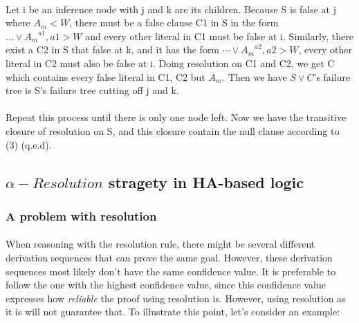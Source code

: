 \documentclass[part1.tex]{subfiles}
\begin{document}
\paragraph{}
Let i be an inference node with j and k are its children. Because S is false at j where \(A_m < W\),
there must be a false clause C1 in S in the form \(...\vee {A_{m}}^{a1}, a1 > W\) and every other 
literal in C1 must be false at i. Similarly, there exist a C2 in S that false at k, and it has the form 
\(\cdots\vee {A_{m}}^{a2}, a2 > W\), every other literal in C2 must also be false at i.
Doing resolution on C1 and C2, we get C which contains every false literal in C1, C2 but \(A_{m}\).
Then we have \(S \vee C\)'s failure tree is S's failure tree cutting off j and k.
\paragraph{} Repeat this process until there is only one node left. Now we have the transitive closure of resolution
on S, and this closure contain the null clause according to (3) (q.e.d).

\subsection{$\alpha-Resolution$ stragety in HA-based logic}
\subsubsection{A problem with resolution} 
\paragraph{} When reasoning with the resolution rule, there might
be several different derivation sequences that can prove the same
goal. However, these derivation sequences most likely don't have
the same confidence value. It is preferable to follow the one
with the highest confidence value, since this confidence value
expresses how {\em reliable} the proof using resolution is.
However, using resolution as it is will not guarantee that. To
illustrate this point, let's consider an example:
\end{document}
